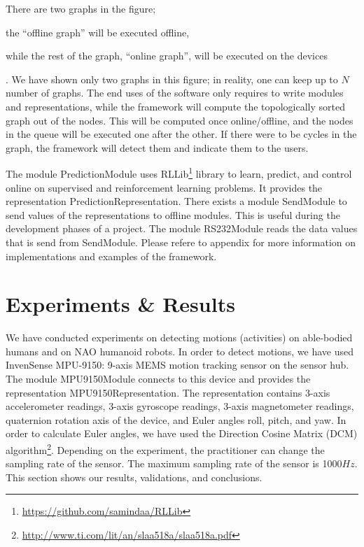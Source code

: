 \documentclass[letterpaper]{article}
\begin{document}
There are two graphs in the figure; \begin{inparaenum}[(1)] \item the ``offline graph'' will be
executed offline, \item while the rest
of the graph, ``online graph'', will be executed on the devices\end{inparaenum}. We have shown only
two graphs in
this figure; in reality, one can keep up to $N$ number of graphs. The end uses of the software only
requires to write modules and representations, while the framework will compute the
topologically sorted graph out of the nodes. This will be computed once online/offline, and the
nodes in the queue will be executed one after the other. If there were to be cycles in the graph,
the framework will detect them and indicate them to the users.

The module {\sf PredictionModule} uses {\sf
RLLib}\footnote{\url{https://github.com/samindaa/RLLib}} library to learn, predict, and control
online on supervised and reinforcement learning problems. It provides
the representation {\sf PredictionRepresentation}. There exists a module {\sf SendModule} to send
values of the representations to offline modules. This is useful during the development phases of
a project. The module {\sf RS232Module} reads the data values that is send from {\sf SendModule}.
Please refere  to appendix for more information on implementations and
examples of the framework.

\section{Experiments \& Results}

We have conducted experiments on detecting motions (activities) on able-bodied humans and on NAO
humanoid robots. In order to detect motions, we have used InvenSense MPU-9150: 9-axis MEMS
motion tracking sensor on the sensor hub. The module {\sf MPU9150Module} connects to this device
and provides the representation {\sf MPU9150Representation}. The representation contains
3-axis accelerometer readings, 3-axis gyroscope readings, 3-axis magnetometer readings, quaternion
rotation axis of the device, and Euler angles roll, pitch, and yaw.  In order to calculate Euler
angles, we have used the Direction Cosine Matrix (DCM)
algorithm\footnote{\url{http://www.ti.com/lit/an/slaa518a/slaa518a.pdf}}.  Depending on the
experiment, the practitioner can change the sampling rate of the sensor.  The maximum sampling rate
of the sensor is 1000$Hz$. This section shows our results, validations, and conclusions.
\end{document}
